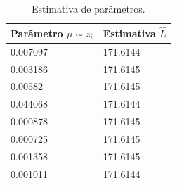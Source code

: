 \documentclass[journal,article,submit,moreauthors,pdftex]{Definitions/mdpi}
\begin{document}
\begin{table}[hbt]
	\centering
	\caption{Estimativa de parâmetros.}\label{tab_est_l_z_fixo_mu_fixo}
\begin{tabular}{@{}ll@{}} \toprule
	Parâmetro $\mu\sim z_i$  & Estimativa $\hat{L}$ \\ \midrule
	 0.007097&  171.6144 \\ 
	 0.003186&  171.6145 \\
	 0.00582 &  171.6145 \\
	 0.044068&  171.6144\\
     0.000878&  171.6145\\
	 0.000725&  171.6145\\
	 0.001358&  171.6145\\ 
	 0.001011&  171.6144\\ \bottomrule
\end{tabular}
\end{table}




  

\end{document}
